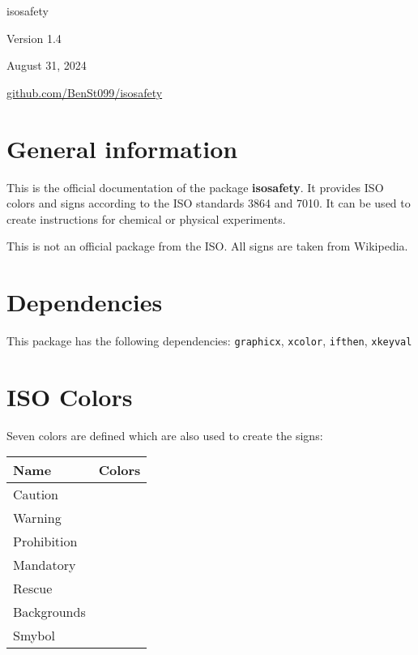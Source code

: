 \documentclass{article}
\begin{document}
\begin{center}
    {\Huge isosafety} \vspace{5mm}

    {\Large Version 1.4}\vspace{5mm}

    {\Large August 31, 2024}\vspace{5mm}

    \href{https://github.com/BenSt099/isosafety}{github.com/BenSt099/isosafety} 
\end{center}\vspace{5mm}

\section{General information}

This is the official documentation of the package \textbf{isosafety}. It provides ISO colors and signs according to the ISO standards
3864 and 7010. It can be used to create instructions for chemical or physical experiments.\vspace{5mm}


\noindent This is not an official package from the ISO. All signs are taken from Wikipedia.

\section{Dependencies}

This package has the following dependencies: \texttt{graphicx}, \texttt{xcolor}, \texttt{ifthen}, \texttt{xkeyval}

\section{ISO Colors}

Seven colors are defined which are also used to create the signs: \vspace{5mm}

\renewcommand{\arraystretch}{1.2}
    \begin{tabular}{|l|l|}
        \hline
        \textbf{Name} & \textbf{Colors} \\ 
        \hline
        Caution & \cellcolor{Caution} \\
        Warning & \cellcolor{Warning} \\
        Prohibition & \cellcolor{Prohibition} \\
        Mandatory & \cellcolor{Mandatory} \\
        Rescue & \cellcolor{Rescue} \\
        Backgrounds & \cellcolor{Backgrounds} \\
        Smybol & \cellcolor{Symbol} \\
        \hline
\end{tabular}\vspace{5mm}
\end{document}
